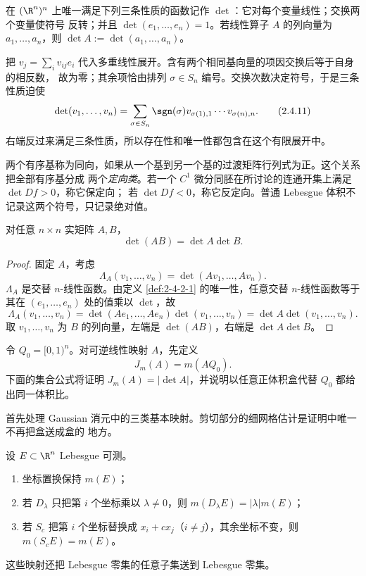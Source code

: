 \begin{definition}[行列式的公理刻画]\label{def:2-4-2-1}
在 $(\R^n)^n$ 上唯一满足下列三条性质的函数记作 $\det$：它对每个变量线性；交换两个变量使符号
反转；并且 $\det(e_1,\dots,e_n)=1$。若线性算子 $A$ 的列向量为 $a_1,\dots,a_n$，则
$\det A:=\det(a_1,\dots,a_n)$。
\end{definition}

把 $v_j=\sum_i v_{ij}e_i$ 代入多重线性展开。含有两个相同基向量的项因交换后等于自身的相反数，
故为零；其余项恰由排列 $\sigma\in S_n$ 编号。交换次数决定符号，于是三条性质迫使
\[
 \det(v_1,\dots,v_n)
 =\sum_{\sigma\in S_n}\sgn(\sigma)
   v_{\sigma(1),1}\cdots v_{\sigma(n),n}.
 \tag{2.4.11}\label{eq:det-leibniz-derived}
\]
右端反过来满足三条性质，所以存在性和唯一性都包含在这个有限展开中。

\begin{definition}[定向]\label{def:2-4-2-2}
两个有序基称为同向，如果从一个基到另一个基的过渡矩阵行列式为正。这个关系把全部有序基分成
两个\emph{定向类}。若一个 $C^1$ 微分同胚在所讨论的连通开集上满足 $\det Df>0$，称它保定向；
若 $\det Df<0$，称它反定向。普通 Lebesgue 体积不记录这两个符号，只记录绝对值。
\end{definition}

\begin{proposition}[行列式乘法性]\label{proposition:2-4-2-1}
对任意 $n\times n$ 实矩阵 $A,B$，
\[
 \det(AB)=\det A\det B.
\]
\end{proposition}

\begin{proof}
固定 $A$，考虑
\[
 \Lambda_A(v_1,\dots,v_n)=\det(Av_1,\dots,Av_n).
\]
$\Lambda_A$ 是交替 $n$-线性函数。由定义 \ref{def:2-4-2-1} 的唯一性，任意交替
$n$-线性函数等于其在 $(e_1,\dots,e_n)$ 处的值乘以 $\det$，故
\[
 \Lambda_A(v_1,\dots,v_n)=\det(Ae_1,\dots,Ae_n)\det(v_1,\dots,v_n)
 =\det A\det(v_1,\dots,v_n).
\]
取 $v_1,\dots,v_n$ 为 $B$ 的列向量，左端是 $\det(AB)$，右端是 $\det A\det B$。
\end{proof}

\begin{definition}[单位盒的线性体积比]\label{def:2-4-2-3}
令 $Q_0=[0,1)^n$。对可逆线性映射 $A$，先定义
\[
 J_m(A)=m(AQ_0).
\]
下面的集合公式将证明 $J_m(A)=|\det A|$，并说明以任意正体积盒代替 $Q_0$ 都给出同一体积比。
\end{definition}

首先处理 Gaussian 消元中的三类基本映射。剪切部分的细网格估计是证明中唯一不再把盒送成盒的
地方。

\begin{lemma}[基本线性映射的体积]\label{lemma:2-4-2-elementary-volume}
设 $E\subset\R^n$ Lebesgue 可测。
\begin{enumerate}
  \item 坐标置换保持 $m(E)$；
  \item 若 $D_\lambda$ 只把第 $i$ 个坐标乘以 $\lambda\ne0$，则
        $m(D_\lambda E)=|\lambda|m(E)$；
  \item 若 $S_c$ 把第 $i$ 个坐标替换成 $x_i+cx_j$（$i\ne j$），其余坐标不变，则
        $m(S_cE)=m(E)$。
\end{enumerate}
这些映射还把 Lebesgue 零集的任意子集送到 Lebesgue 零集。
\end{lemma}

